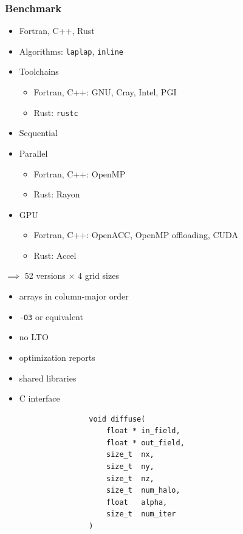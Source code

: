 \documentclass[aspectratio=43, t]{beamer}
\begin{document}
\begin{frame}
	\frametitle{Benchmark}
	\begin{itemize}
		\item Fortran, C++, Rust
		\item Algorithms: \texttt{laplap}, \texttt{inline}
		\item Toolchains
			\begin{itemize}
				\item Fortran, C++: GNU, Cray, Intel, PGI
				\item Rust: \texttt{rustc}
			\end{itemize}
		\item Sequential
		\item Parallel
			\begin{itemize}
				\item Fortran, C++: OpenMP
				\item Rust: Rayon
			\end{itemize}
		\item GPU
			\begin{itemize}
				\item Fortran, C++: OpenACC, OpenMP offloading, CUDA
				\item Rust: Accel
			\end{itemize}
	\end{itemize}

	$\implies$ 52 versions $\times$ 4 grid sizes
\end{frame}

\begin{frame}[fragile]
	\begin{itemize}
		\item arrays in column-major order
		\item \texttt{-O3} or equivalent
		\item no LTO
		\item optimization reports
		\item shared libraries
		\item C interface \\
			\begin{verbatim}
				void diffuse(
					float * in_field,
					float * out_field,
					size_t  nx,
					size_t  ny,
					size_t  nz,
					size_t  num_halo,
					float   alpha,
					size_t  num_iter
				)
			\end{verbatim}
	\end{itemize}

\end{frame}
\end{document}
